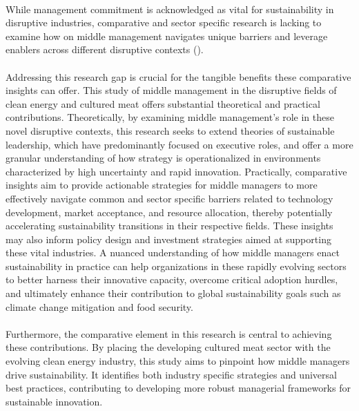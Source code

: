 \paragraph*{} While management commitment is acknowledged as vital for sustainability in disruptive industries, comparative and sector specific research is lacking to examine how on middle management navigates unique barriers and leverage enablers across different disruptive contexts (\textcite{Lozano2015, Egri2000}).

\paragraph*{} Addressing this research gap is crucial for the tangible benefits these comparative insights can offer. This study of middle management in the disruptive fields of clean energy and cultured meat offers substantial theoretical and practical contributions. Theoretically, by examining middle management's role in these novel disruptive contexts, this research seeks to extend theories of sustainable leadership, which have predominantly focused on executive roles, and offer a more granular understanding of how strategy is operationalized in environments characterized by high uncertainty and rapid innovation. Practically, comparative insights aim to provide actionable strategies for middle managers to more effectively navigate common and sector specific barriers related to technology development, market acceptance, and resource allocation, thereby potentially accelerating sustainability transitions in their respective fields. These insights may also inform policy design and investment strategies aimed at supporting these vital industries. A nuanced understanding of how middle managers enact sustainability in practice can help organizations in these rapidly evolving sectors to better harness their innovative capacity, overcome critical adoption hurdles, and ultimately enhance their contribution to global sustainability goals such as climate change mitigation and food security.

\paragraph*{} Furthermore, the comparative element in this research is central to achieving these contributions. By placing the developing cultured meat sector with the evolving clean energy industry, this study aims to pinpoint how middle managers drive sustainability. It identifies both industry specific strategies and universal best practices, contributing to developing more robust managerial frameworks for sustainable innovation.
